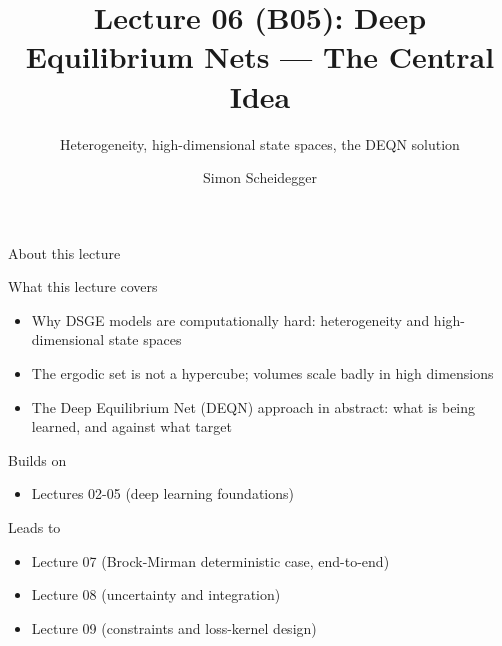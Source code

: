 \documentclass[aspectratio=169,11pt]{beamer}
\title[Lecture 06 (B05)]{Lecture 06 (B05): Deep Equilibrium Nets --- The Central Idea}
\subtitle{Heterogeneity, high-dimensional state spaces, the DEQN solution}
\author{Simon Scheidegger}
\institute{HEC, University of Lausanne}
\date{}
\begin{document}
\providecommand{\exercisepause}{%
  \tikz[baseline=(X.base)]{\node[fill=darkgreen!80!black, text=white,
  rounded corners=2pt, inner sep=3pt, font=\scriptsize\bfseries](X){PAUSE};}}

{
\begin{frame}
\titlepage
\end{frame}
}

\begin{frame}{About this lecture}
\small
\begin{block}{What this lecture covers}
\begin{itemize}\itemsep2pt
  \item Why DSGE models are computationally hard: heterogeneity and high-dimensional state spaces
  \item The ergodic set is not a hypercube; volumes scale badly in high dimensions
  \item The Deep Equilibrium Net (DEQN) approach in abstract: what is being learned, and against what target
\end{itemize}
\end{block}
\begin{block}{Builds on}
\begin{itemize}\itemsep2pt
  \item Lectures 02-05 (deep learning foundations)
\end{itemize}
\end{block}
\begin{block}{Leads to}
\begin{itemize}\itemsep2pt
  \item Lecture 07 (Brock-Mirman deterministic case, end-to-end)
  \item Lecture 08 (uncertainty and integration)
  \item Lecture 09 (constraints and loss-kernel design)
\end{itemize}
\end{block}
\end{frame}
\end{document}
